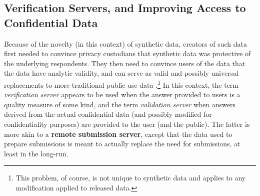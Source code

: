 \documentclass[inline]{hdsr}
\begin{document}
\subsection{Verification Servers, and Improving Access to Confidential Data}
\label{sec1}

Because of the novelty (in this context) of synthetic data, creators of such data first needed to convince privacy custodians that synthetic data was protective of the underlying respondents. They then need to convince users of the data that the data have analytic validity, and can serve as valid and possibly universal replacements to more traditional public use data \citep{reiter_verification_2009}.\footnote{This problem, of course, is not unique to synthetic data and applies to any modification applied to released data.} In this context, the term \textit{verification server} appears to be used  when the answer provided to users is a quality measure of some kind, and the term \textit{validation server} when answers derived from the actual confidential data (and possibly modified for confidentiality purposes) are provided to the user (and the public). The latter is more akin to a \textbf{remote submission server}, except that the data used to prepare submissions is meant to actually replace the need for submissions, at least in the long-run.  
\end{document}
